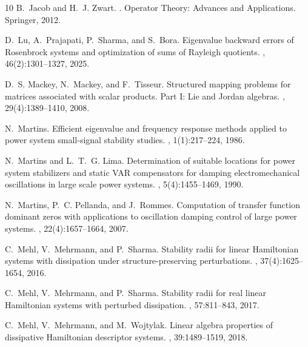 \documentclass[11pt]{article}
\begin{document}
\begin{thebibliography}{10}
B.~Jacob and H.~J. Zwart.
.
\newblock Operator Theory: Advances and Applications. Springer, 2012.

D.~Lu, A.~Prajapati, P.~Sharma, and S.~Bora.
\newblock Eigenvalue backward errors of {R}osenbrock systems and optimization
  of sums of {R}ayleigh quotients.
,
  46(2):1301--1327, 2025.

D.~S. Mackey, N.~Mackey, and F.~Tisseur.
\newblock Structured mapping problems for matrices associated with scalar
  products. {P}art {I}: {L}ie and {J}ordan algebras.
,
  29(4):1389--1410, 2008.

N.~Martins.
\newblock Efficient eigenvalue and frequency response methods applied to power
  system small-signal stability studies.
, 1(1):217--224, 1986.

N.~Martins and L.~T.~G. Lima.
\newblock Determination of suitable locations for power system stabilizers and
  static {VAR} compensators for damping electromechanical oscillations in large
  scale power systems.
, 5(4):1455--1469, 1990.

N.~Martins, P.~C. Pellanda, and J.~Rommes.
\newblock Computation of transfer function dominant zeros with applications to
  oscillation damping control of large power systems.
, 22(4):1657--1664, 2007.

C.~Mehl, V.~Mehrmann, and P.~Sharma.
\newblock Stability radii for linear {H}amiltonian systems with dissipation
  under structure-preserving perturbations.
,
  37(4):1625--1654, 2016.

C.~Mehl, V.~Mehrmann, and P.~Sharma.
\newblock Stability radii for real linear {H}amiltonian systems with perturbed
  dissipation.
, 57:811--843, 2017.

C.~{Mehl}, V.~{Mehrmann}, and M.~{Wojtylak}.
\newblock Linear algebra properties of dissipative {H}amiltonian descriptor
  systems.
,
  39:1489--1519, 2018.


\end{thebibliography}
\end{document}
